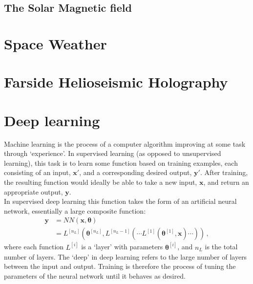 \documentclass[11pt,a4paper,onecolumn]{report}
\begin{document}
%
\subsection{The Solar Magnetic field}
%
\label{sec:solar magnetic field}


%
%
\section{Space Weather}
%
%



%
%
\section{Farside Helioseismic Holography}
%
%


%
%
\section{Deep learning}
%
%

\label{sec: deep learning}
Machine learning is the process of a computer algorithm improving at some task
through `experience'. In supervised learning (as opposed to unsupervised
learning), this task is to learn some function based on training examples,
each consisting of an input, \(\bm{x'}\), and a corresponding desired output,
\(\bm{y'}\). After training, the resulting function would ideally be able to
take a new input, \(\bm{x}\), and return an appropriate output, \(\bm{y}\). \\

In supervised deep learning this function takes the form of an artificial neural
network, essentially a large composite function:
\begin{align}
  \bm{y} &= NN(\bm{x}, \bm{\theta})\\
  &= L^{[n_L]}(\bm{\theta}^{[n_L]}, L^{[n_L-1]}( \dotsm L^{[1]}(\bm{\theta}^{[1]}, \bm{x}) \dotsm ))\,, 
\end{align}
where each function \(L^{[i]}\) is a `layer' with parameters
\(\bm{\theta}^{[i]}\), and \(n_L\) is the total number of layers. The `deep' in deep
learning refers to the large number of layers between the input and output.
Training is therefore the process of tuning the parameters of the neural
network until it behaves as desired. \\
\end{document}
